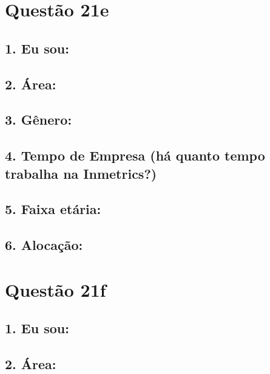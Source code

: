 \documentclass[]{book}
\begin{document}
\hypertarget{questao-21e}{%
\section{Questão 21e}\label{questao-21e}}

\hypertarget{eu-sou-65}{%
\subsection{1. Eu sou:}\label{eu-sou-65}}

\hypertarget{area-65}{%
\subsection{2. Área:}\label{area-65}}

\hypertarget{genero-65}{%
\subsection{3. Gênero:}\label{genero-65}}

\hypertarget{tempo-de-empresa-ha-quanto-tempo-trabalha-na-inmetrics-65}{%
\subsection{4. Tempo de Empresa (há quanto tempo trabalha na Inmetrics?)}\label{tempo-de-empresa-ha-quanto-tempo-trabalha-na-inmetrics-65}}

\hypertarget{faixa-etaria-65}{%
\subsection{5. Faixa etária:}\label{faixa-etaria-65}}

\hypertarget{alocacao-65}{%
\subsection{6. Alocação:}\label{alocacao-65}}

\hypertarget{questao-21f}{%
\section{Questão 21f}\label{questao-21f}}

\hypertarget{eu-sou-66}{%
\subsection{1. Eu sou:}\label{eu-sou-66}}

\hypertarget{area-66}{%
\subsection{2. Área:}\label{area-66}}
\end{document}

